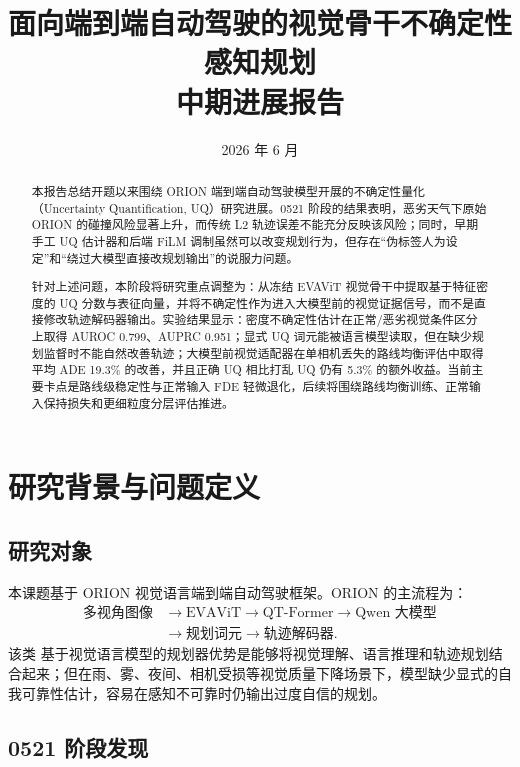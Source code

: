\documentclass[12pt, a4paper]{ctexart}
\title{\textbf{面向端到端自动驾驶的视觉骨干不确定性感知规划}\\[0.6em]
\large 中期进展报告}
\author{}
\date{2026 年 6 月}
\begin{document}
\maketitle
\thispagestyle{fancy}

\begin{abstract}
本报告总结开题以来围绕 ORION 端到端自动驾驶模型开展的不确定性量化（Uncertainty Quantification, UQ）研究进展。0521 阶段的结果表明，恶劣天气下原始 ORION 的碰撞风险显著上升，而传统 L2 轨迹误差不能充分反映该风险；同时，早期手工 UQ 估计器和后端 FiLM 调制虽然可以改变规划行为，但存在“伪标签人为设定”和“绕过大模型直接改规划输出”的说服力问题。

针对上述问题，本阶段将研究重点调整为：从冻结 EVAViT 视觉骨干中提取基于特征密度的 UQ 分数与表征向量，并将不确定性作为进入大模型前的视觉证据信号，而不是直接修改轨迹解码器输出。实验结果显示：密度不确定性估计在正常/恶劣视觉条件区分上取得 AUROC 0.799、AUPRC 0.951；显式 UQ 词元能被语言模型读取，但在缺少规划监督时不能自然改善轨迹；大模型前视觉适配器在单相机丢失的路线均衡评估中取得平均 ADE 19.3\% 的改善，并且正确 UQ 相比打乱 UQ 仍有 5.3\% 的额外收益。当前主要卡点是路线级稳定性与正常输入 FDE 轻微退化，后续将围绕路线均衡训练、正常输入保持损失和更细粒度分层评估推进。
\end{abstract}

\tableofcontents
\newpage

\section{研究背景与问题定义}

\subsection{研究对象}

本课题基于 ORION 视觉语言端到端自动驾驶框架\cite{fu2025orion}。ORION 的主流程为：
\[
\begin{aligned}
    \text{多视角图像}
    &\rightarrow \text{EVAViT}
    \rightarrow \text{QT-Former}
    \rightarrow \text{Qwen 大模型} \\
    &\rightarrow \text{规划词元}
    \rightarrow \text{轨迹解码器}.
\end{aligned}
\]
该类 基于视觉语言模型的规划器优势是能够将视觉理解、语言推理和轨迹规划结合起来；但在雨、雾、夜间、相机受损等视觉质量下降场景下，模型缺少显式的自我可靠性估计，容易在感知不可靠时仍输出过度自信的规划。

\subsection{0521 阶段发现}
\end{document}
